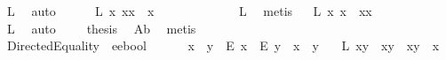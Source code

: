 \begin{isabellebody}
\ L{}\ \isamarkupfalse%
\ auto\ \ \ \isanewline
\ \isamarkupfalse%
\ L{}{}{\isacharcolon}\ {\isachardoublequoteopen}{\isasymforall}x{\isachardot}\ {\isacharparenleft}{\isasymbox}x{\isacharparenright}{\isasymcdot}{\isacharparenleft}{\isacharparenleft}{\isasymbox}x{\isacharparenright}{\isasymbox}{\isacharparenright}\ {\isasymapprox}\ {\isacharparenleft}{\isasymbox}x{\isacharparenright}{\isasymbox}{\isachardoublequoteclose}\ \ \ \ \ \ \ \ \ \ \ \ \isamarkupfalse%
\ L{}{}\ \isamarkupfalse%
\ metis\isanewline
\ \isamarkupfalse%
\ L{}{}{\isacharcolon}\ {\isachardoublequoteopen}{\isasymforall}x{\isachardot}\ {\isacharparenleft}{\isasymbox}x{\isacharparenright}{\isasymbox}\ {\isasymapprox}\ {\isacharparenleft}{\isasymbox}x{\isacharparenright}{\isasymcdot}{\isacharparenleft}{\isacharparenleft}{\isasymbox}x{\isacharparenright}{\isasymbox}{\isacharparenright}{\isachardoublequoteclose}\ \ \ \ \ \ \ \ \ \ \ \ \isamarkupfalse%
\ L{}{}\ \isamarkupfalse%
\ auto\isanewline
\ \isamarkupfalse%
\ \isamarkupfalse%
\ {\isacharquery}thesis\ \isamarkupfalse%
\ A{}b\ \isamarkupfalse%
\ metis\isanewline
{}\isamarkupfalse%
%
\endisatagproof
{\isafoldproof}%
%
\isadelimproof
\ \ \ \ \ \ \ \ \ \ \ \ \ \ \ \ \ \ \ \ \ \isanewline
%
\endisadelimproof
\isanewline
\isanewline
{}\isamarkupfalse%
\ DirectedEquality\ {\isacharcolon}{\isacharcolon}\ {\isachardoublequoteopen}e{\isasymRightarrow}e{\isasymRightarrow}bool{\isachardoublequoteclose}\ {\isacharparenleft}\ {\isachardoublequoteopen}{\isasymgreaterapprox}{\isachardoublequoteclose}\ {}{}{\isacharparenright}\ \isanewline
\ \ {\isachardoublequoteopen}x\ {\isasymgreaterapprox}\ y\ {\isasymequiv}\ {\isacharparenleft}{\isacharparenleft}E\ x{\isacharparenright}\ \isactrlbold {\isasymrightarrow}\ {\isacharparenleft}E\ y{\isacharparenright}{\isacharparenright}\ \isactrlbold {\isasymand}\ x\ \isactrlbold {\isacharequal}\ y{\isachardoublequoteclose}\ \ \isanewline
\isanewline
{}\isamarkupfalse%
\ L{}{\isacharunderscore}{}{}{\isacharcolon}\ {\isachardoublequoteopen}{\isacharparenleft}{\isacharparenleft}{\isasymbox}{\isacharparenleft}x{\isasymcdot}y{\isacharparenright}{\isacharparenright}\ {\isasymapprox}\ {\isacharparenleft}{\isasymbox}{\isacharparenleft}x{\isasymcdot}{\isacharparenleft}{\isasymbox}y{\isacharparenright}{\isacharparenright}{\isacharparenright}{\isacharparenright}\ \isactrlbold {\isasymleftrightarrow}\ {\isacharparenleft}{\isacharparenleft}{\isasymbox}{\isacharparenleft}x{\isasymcdot}y{\isacharparenright}{\isacharparenright}\ {\isasymgreaterapprox}\ {\isasymbox}x{\isacharparenright}{\isachardoublequoteclose}\ \isanewline

\end{isabellebody}
